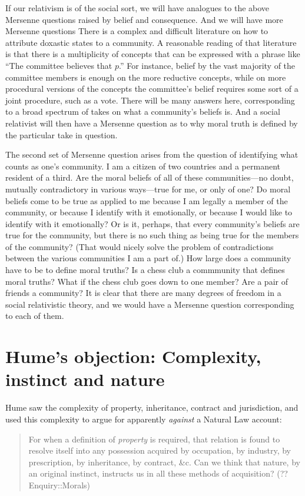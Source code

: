 If our relativism is of the social sort, we will have analogues to the above Mersenne questions raised by belief and consequence.  And we 
will have more Mersenne questions There is a complex and difficult literature on how to attribute doxastic states to a community. A reasonable
reading of that literature is that there is a multiplicity of concepts that can be expressed with a phrase like ``The committee believes 
that $p$.'' For instance, belief by the vast majority of the committee members is enough on the more reductive concepts, 
while on more procedural versions of the concepts the committee's belief requires some sort of a joint procedure, such as a vote. 
There will be many answers here, corresponding to a broad spectrum of takes on what a community's beliefs is. And a social relativist
will then have a Mersenne question as to why moral truth is defined by the particular take in question.

The second set of Mersenne question arises from the question of identifying what counts as one's community. I am a citizen of two countries
and a permanent resident of a third. Are the moral beliefs of all of these communities---no doubt, mutually contradictory in various ways---true
for me, or only of one? Do moral beliefs come to be true as applied to me because I am legally a member of the community, or because I identify
with it emotionally, or because I would like to identify with it emotionally? Or is it, perhaps, that every community's beliefs are true
for the community, but there is no such thing as being true for the members of the community? (That would nicely solve the problem of
contradictions between the various communities I am a part of.) How large does a community have to be to define moral truths? Is a chess
club a commmunity that defines moral truths? What if the chess club goes down to one member? Are a pair of friends a community? It is clear
that there are many degrees of freedom in a social relativistic theory, and we would have a Mersenne question corresponding to each of them.

\section{Hume's objection: Complexity, instinct and nature}
Hume saw the complexity of property, inheritance, contract and jurisdiction, and used this complexity to argue for
apparently \textit{against} a Natural Law account: 
\begin{quote}
For when a definition of \textit{property} is required, that relation is found to resolve itself into any
possession acquired by occupation, by industry, by prescription, by inheritance, by contract, \&c. Can
we think that nature, by an original instinct, instructs us in all these methods of acquisition?
(??Enquiry::Morals)
\end{quote}

